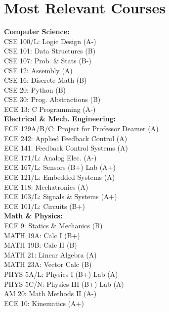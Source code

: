 \documentclass[a4paper,9pt]{article}
\begin{document}
\section*{Most Relevant Courses}
\small
\begin{multicols}{3}
    \textbf{Computer Science:} \\
    CSE 100/L: Logic Design (A-) \\
    CSE 101: Data Structures (B) \\
    CSE 107: Prob. \& Stats (B-) \\
    CSE 12: Assembly (A) \\
    CSE 16: Discrete Math (B) \\
    CSE 20: Python (B) \\
    CSE 30: Prog. Abstractions (B) \\
    ECE 13: C Programming (A-) \\

    \columnbreak
    \textbf{Electrical \& Mech. Engineering:} \\
    ECE 129A/B/C: Project for Professor Deamer (A) \\
    ECE 242: Applied Feedback Control (A) \\
    ECE 141: Feedback Control Systems (A) \\
    ECE 171/L: Analog Elec. (A-) \\
    ECE 167/L: Sensors (B+) Lab (A+)\\
    ECE 121/L: Embedded Systems (A) \\
    ECE 118: Mechatronics (A) \\
    ECE 103/L: Signals \& Systems (A+) \\
    ECE 101/L: Circuits (B+) \\


    \columnbreak
    \textbf{Math \& Physics:} \\
    ECE 9: Statics \& Mechanics (B) \\
    MATH 19A: Calc I (B+) \\
    MATH 19B: Calc II (B) \\
    MATH 21: Linear Algebra (A) \\
    MATH 23A: Vector Calc (B) \\
    PHYS 5A/L: Physics I (B+) Lab (A) \\
    PHYS 5C/N: Physics III (B+) Lab (A) \\
    AM 20: Math Methods II (A-) \\
    ECE 10: Kinematics (A+) \\

\end{multicols}
\normalsize
\end{document}
